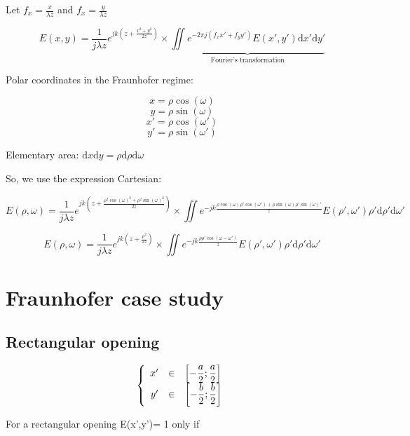 \documentclass[10pt,a4paper]{article}
\begin{document}
Let $f_x=\frac{x}{\lambda z}$ and $f_x=\frac{y}{\lambda z}$

\[
E(x,y)=\frac{1}{j\lambda z} e^{jk\left(z+\frac{x^2+y^2}{2z}\right)}
\times \underbrace{
	\iint e^{-2\pi j(f_xx'+f_yy')}E(x',y')\mathrm{d}x'\mathrm{d}y'
}_\text{Fourier's transformation}
\]

Polar coordinates in the Fraunhofer regime:

\[x=\rho \cos(\omega) \]
\[y=\rho \sin(\omega) \]
\[x'=\rho \cos(\omega') \]
\[y'=\rho \sin(\omega') \]

Elementary area: $\mathrm{d}x\mathrm{d}y=\rho \mathrm{d}\rho \mathrm{d}\omega$

So, we use the expression Cartesian:

\[
E(\rho,\omega)=\frac{1}{j\lambda z} e^{jk\left(z+\frac{\rho^2 \cos(\omega)^2+\rho^2 \sin(\omega)^2}{2z}\right)}
\times \iint e^{-jk\frac{\rho \cos(\omega)\rho' \cos(\omega')+\rho \sin(\omega)\rho' \sin(\omega)'}{z}}
E(\rho',\omega')\rho' \mathrm{d}\rho'\mathrm{d}\omega'
\]

\[
E(\rho,\omega)=\frac{1}{j\lambda z} e^{jk\left(z+\frac{\rho^2}{2z}\right)}
\times \iint e^{-jk\frac{\rho\rho'\cos(\omega-\omega')}{z}}
E(\rho',\omega')\rho' \mathrm{d}\rho'\mathrm{d}\omega'
\]

\section{Fraunhofer case study}
	\subsection{Rectangular opening}
\[
\left \{
\begin{array}{r c l}
x' & \in & \left[-\dfrac{a}{2};\dfrac{a}{2}\right]\\
y' & \in & \left[-\dfrac{b}{2};\dfrac{b}{2}\right]
\end{array}
\right .
\]

For a rectangular opening E(x’,y’)= 1 only if
\end{document}
